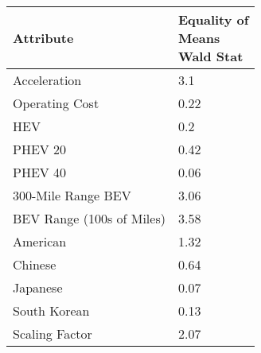 \begin{tabular}{ll}
\toprule
                Attribute & \makecell{Equality of \\ Means \\ Wald Stat} \\
\midrule
             Acceleration &                         \multirow{1}{*}{3.1} \\
           Operating Cost &                        \multirow{1}{*}{0.22} \\
                      HEV &                         \multirow{1}{*}{0.2} \\
                  PHEV 20 &                        \multirow{1}{*}{0.42} \\
                  PHEV 40 &                        \multirow{1}{*}{0.06} \\
       300-Mile Range BEV &                        \multirow{1}{*}{3.06} \\
BEV Range (100s of Miles) &                        \multirow{1}{*}{3.58} \\
                 American &                        \multirow{1}{*}{1.32} \\
                  Chinese &                        \multirow{1}{*}{0.64} \\
                 Japanese &                        \multirow{1}{*}{0.07} \\
             South Korean &                        \multirow{1}{*}{0.13} \\
           Scaling Factor &                        \multirow{1}{*}{2.07} \\
\bottomrule
\end{tabular}
